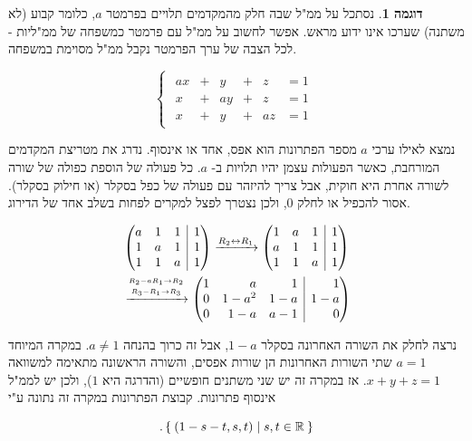 \documentclass[12pt]{report}
\theoremstyle{plain}
\theoremstyle{definition}
\newtheorem{example}{דוגמה}[chapter]
\newcommand{\R}{\mathbb{R}}
\newcommand{\0}{\mathbf{0}}
\begin{document}
\begin{example}\label{ex:1-parameter}
נסתכל על ממ"ל שבה חלק מהמקדמים תלויים בפרמטר
$a$,
כלומר קבוע (לא משתנה) שערכו אינו ידוע מראש. אפשר לחשוב על ממ"ל עם פרמטר כמשפחה של ממ"ליות - לכל הצבה של ערך הפרמטר נקבל ממ"ל מסוימת במשפחה.

$$
\begin{cases}
\begin{alignedat}{7}
a x &{}+{}&  y &{}+{}&  z &= 1 \\[4pt]
x &{}+{}&  a y &{}+{}&  z &= 1 \\[4pt]
x &{}+{}&  y &{}+{}&  a z &= 1
\end{alignedat}
\end{cases}
$$

נמצא לאילו ערכי
$a$
מספר הפתרונות הוא אפס, אחד או אינסוף.
נדרג את מטריצת המקדמים המורחבת, כאשר הפעולות עצמן יהיו תלויות ב-
$a$. 
כל פעולה של הוספת כפולה של שורה לשורה אחרת היא חוקית, אבל צריך להיזהר עם פעולה של כפל בסקלר (או חילוק בסקלר). אסור להכפיל או לחלק 
$0$,
ולכן נצטרך לפצל למקרים לפחות בשלב אחד של הדירוג.

$$
\begin{aligned}
&\left(\begin{array}{@{}rrr|r@{}}
a & 1 & 1 & 1 \\
1 & a & 1 & 1 \\
1 & 1 & a & 1
\end{array}\right)
\xrightarrow{R_2\leftrightarrow R_1}
\left(\begin{array}{@{}rrr|r@{}}
1 & a & 1 & 1 \\
a & 1 & 1 & 1 \\
1 & 1 & a & 1
\end{array}\right) \\
&\xrightarrow{\overset{R_2 - aR_1 \to R_2}{\underset{R_3 - R_1 \to R_3}{\hphantom{\quad\quad}}}}
\left(\begin{array}{@{}rrr|r@{}}
1 & a & 1 & 1 \\
0 & 1-a^2 & 1-a & 1-a\\
0 & 1-a & a-1 & 0
\end{array}\right)
\end{aligned}
$$

נרצה לחלק את השורה האחרונה בסקלר 
$1-a$,
אבל זה כרוך בהנחה
$a\neq 1$.
במקרה המיוחד
$a=1$
שתי השורות האחרונות הן שורות אפסים, והשורה הראשונה מתאימה למשוואה
$x+y+z=1$.
אז במקרה זה יש שני משתנים חופשיים (והדרגה היא 
$1$),
ולכן יש לממ"ל אינסוף פתרונות. קבוצת הפתרונות במקרה זה נתונה ע"י

$$
.\Set{(1-s-t,s,t)|s,t\in\R}
$$


\end{example}
\end{document}
